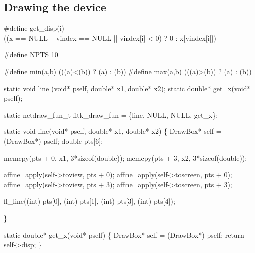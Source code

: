 \subsection{Drawing the device}

\nwenddocs{}\endmoddef
#define get_disp(i) \\
    ((x == NULL || vindex == NULL || vindex[i] < 0) ? 0 : x[vindex[i]])

#define NPTS 10

#define min(a,b) (((a)<(b)) ? (a) : (b))
#define max(a,b) (((a)>(b)) ? (a) : (b))

\nwendcode{}\nwdocspar

\nwenddocs{}\endmoddef
static void    line (void* pself, double* x1, double* x2);
static double* get_x(void* pself);

static netdraw_fun_t fltk_draw_fun = \{line, NULL, NULL, get_x\};

\nwendcode{}\nwdocspar

\nwenddocs{}\endmoddef
static void line(void* pself, double* x1, double* x2)
\{
    DrawBox* self = (DrawBox*) pself;
    double pts[6];

    memcpy(pts + 0, x1, 3*sizeof(double));
    memcpy(pts + 3, x2, 3*sizeof(double));

    affine_apply(self->toview,   pts + 0);
    affine_apply(self->toscreen, pts + 0);
    affine_apply(self->toview,   pts + 3);
    affine_apply(self->toscreen, pts + 3);

    fl_line((int) pts[0], (int) pts[1], 
            (int) pts[3], (int) pts[4]);

\}

\nwendcode{}\nwdocspar

\nwenddocs{}\plusendmoddef
static double* get_x(void* pself)
\{
    DrawBox* self = (DrawBox*) pself;
    return self->disp;
\}

